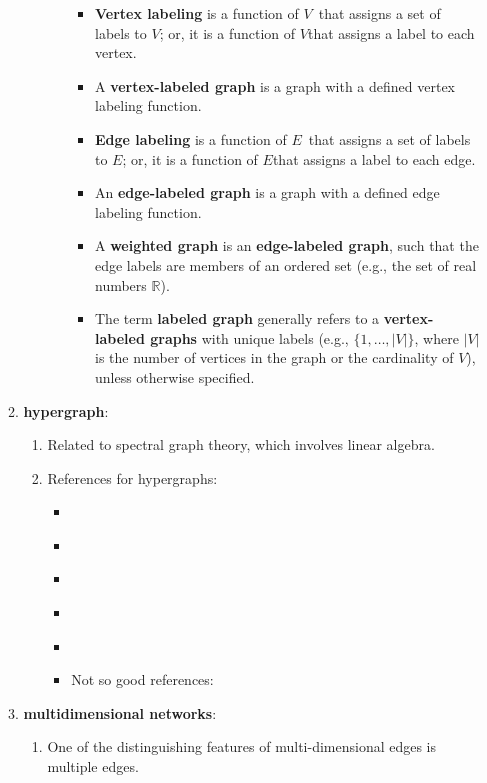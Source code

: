 \begin{enumerate}
\begin{enumerate}
\begin{enumerate}
\begin{itemize}
\begin{itemize}
				\item {\bf Vertex labeling} is a function of $V$\ that assigns a set of labels to $V$; or, it is a function of $V$that assigns a label to each vertex.
				\item A {\bf vertex-labeled graph} is a graph with a defined vertex labeling function.
				\item {\bf Edge labeling} is a function of $E$\ that assigns a set of labels to $E$; or, it is a function of $E$that assigns a label to each edge.
				\item An {\bf edge-labeled graph} is a graph with a defined edge labeling function.
				\item A {\bf weighted graph} is an {\bf edge-labeled graph}, such that the edge labels are members of an ordered set (e.g., the set of real numbers $\mathbb{R}$).
				\item The term {\bf labeled graph} generally refers to a {\bf vertex-labeled graphs} with unique labels (e.g., $\{1, \dots, |V|\}$, where $|V|$ is the number of vertices in the graph or the cardinality of $V$), unless otherwise specified.
				\end{itemize}
			\end{itemize}
		\end{enumerate}
	\item {\bf hypergraph}: \vspace{-0.2cm}
		\begin{enumerate} \itemsep -2pt
		\item Related to spectral graph theory, which involves linear algebra.
		\item References for hypergraphs:
			\begin{itemize}
			\item \cite{Bretto2013}
			\item \cite{Cong2003a}
			\item \cite{Alpert1996}
			\item \cite{Berge1989}
			\item \cite{Johnson2013b}
			\item Not so good references: \cite{Basu2007,Lovasz2012,Bunke2008,Crama2011,Lecoutre2009,Carrington2005,Scheinerman1997,Sarrafzadeh1996}
			\end{itemize}
		\end{enumerate}
	\item {\bf multidimensional networks}: \vspace{-0.2cm}
		\begin{enumerate} \itemsep -2pt
		\item One of the distinguishing features of multi-dimensional edges is multiple edges.

\end{enumerate}
\end{enumerate}
\end{enumerate}
